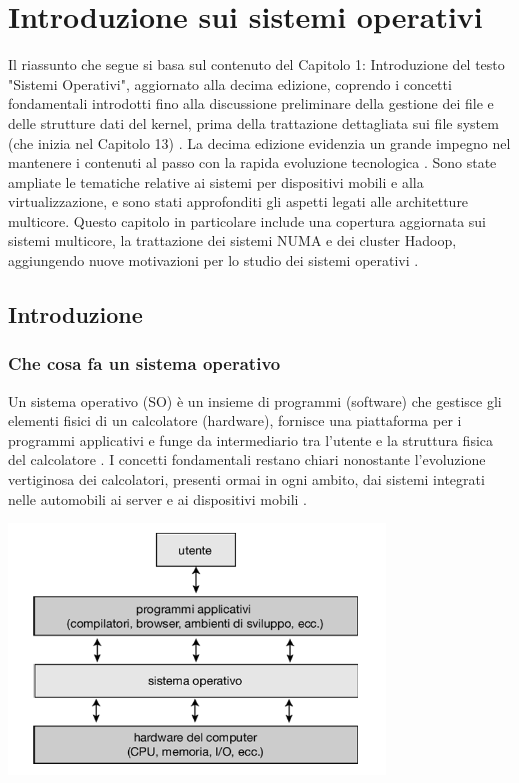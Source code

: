 \documentclass[12pt,a4paper, openany]{book}
\begin{document}
	\chapter{Introduzione sui sistemi operativi}
	\begin{small} Il riassunto che segue si basa sul contenuto del Capitolo 1: Introduzione del testo "Sistemi Operativi", aggiornato alla decima edizione, coprendo i concetti fondamentali introdotti fino alla discussione preliminare della gestione dei file e delle strutture dati del kernel, prima della trattazione dettagliata sui file system (che inizia nel Capitolo 13)
		.
		La decima edizione evidenzia un grande impegno nel mantenere i contenuti al passo con la rapida evoluzione tecnologica
		. Sono state ampliate le tematiche relative ai sistemi per dispositivi mobili e alla virtualizzazione, e sono stati approfonditi gli aspetti legati alle architetture multicore. Questo capitolo in particolare include una copertura aggiornata sui sistemi multicore, la trattazione dei sistemi NUMA e dei cluster Hadoop, aggiungendo nuove motivazioni per lo studio dei sistemi operativi
		.
		\section{Introduzione}
		\subsection{Che cosa fa un sistema operativo} Un sistema operativo (SO) è un insieme di programmi (software) che gestisce gli elementi fisici di un calcolatore (hardware), fornisce una piattaforma per i programmi applicativi e funge da intermediario tra l'utente e la struttura fisica del calcolatore
		. I concetti fondamentali restano chiari nonostante l'evoluzione vertiginosa dei calcolatori, presenti ormai in ogni ambito, dai sistemi integrati nelle automobili ai server e ai dispositivi mobili
		.
		
		\includegraphics[width=10cm, center]{img/1.1.2.0}

\end{small}
\end{document}
